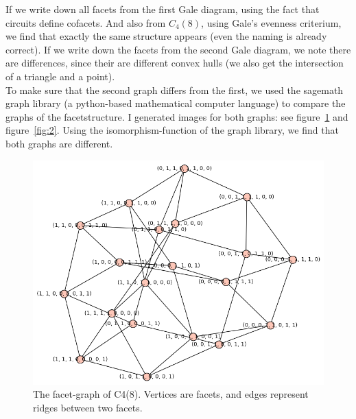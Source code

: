 \documentclass[paper=a4, fontsize=11pt]{scrartcl} %
\theoremstyle{plain}
\begin{document}
If we write down all facets from the first Gale diagram, using the fact that circuits define cofacets. And also from $C_4(8)$, using Gale's evenness criterium, we find that exactly the same structure appears (even the naming is already correct). If we write down the facets from the second Gale diagram, we note there are differences, since their are different convex hulls (we also get the intersection of a triangle and a point).\\

To make sure that the second graph differs from the first, we used the sagemath graph library (a python-based mathematical computer language) to compare the graphs of the facetstructure. I generated images for both graphs: see figure~\ref{fig:1} and figure~\ref{fig:2}. Using the isomorphism-function of the graph library, we find that both graphs are different.

\begin{figure}[htbp] %
   \centering
   \includegraphics[width=\textwidth]{C4(8)} 
   \caption{The facet-graph of C4(8). Vertices are facets, and edges represent ridges between two facets.}
   \label{fig:1}
\end{figure}
\end{document}
